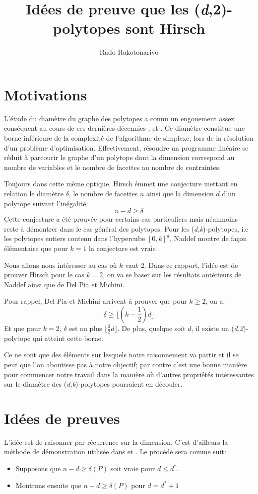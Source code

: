 \documentclass[11pt]{article}
\begin{document}
\title{Idées de preuve que les (\textit{d},2)-polytopes sont Hirsch}
\author{Rado Rakotonarivo}
\maketitle

\section{Motivations}
L'étude du diamètre du graphe des polytopes a connu un engouement assez conséquent au cours de ces dernières décennies \cite{deza2016improved}, \cite{naddef1989hirsch} et \cite{del2016diameter}. Ce diamètre constitue une borne inférieure de la complexité de l'algorithme de simplexe, lors de la résolution d'un problème d'optimisation. Effectivement, résoudre un programme linéaire se réduit à parcourir le graphe d'un polytope dont la dimension correspond au nombre de variables et le nombre de facettes au nombre de contraintes.

Toujours dans cette même optique, Hirsch émmet une conjecture  mettant en relation le diamètre $\delta$, le nombre de facettes $n$ ainsi que la dimension $d$ d'un polytope suivant l'inégalité: 
$$
	n-d\geq{\delta}
$$
Cette conjecture a été prouvée pour certains cas particuliers mais néanmoins reste à démontrer dans le cas général des polytopes. Pour les
(\textit{d,k})-polytopes, i.e les polytopes entiers contenu dans l'hypercube $[0,k]^d$, Naddef montre de façon élémentaire que pour $k=1$ la conjecture est vraie \cite{naddef1989hirsch}. 

Nous allons nous intéresser au cas où $k$ vaut 2. Dans ce rapport, l'idée est de prouver Hirsch pour le cas $k = 2$, on va se baser sur les résultats antérieurs de Naddef ainsi que de Del Pia et Michini. 

Pour rappel, Del Pia et Michini arrivent à prouver que pour $k\geq{2}$, on a:  
$$ 
	\delta\geq{\lfloor{(k-\frac{1}{2})}d\rfloor}
$$ 
Et que pour $k=2$, $\delta$ est au plus $\lfloor{\frac{3}{2}}d\rfloor$. De plus, quelque soit $d$, il existe un (\textit{d,2})-polytope qui atteint cette borne.

Ce ne sont que des éléments sur lesquels notre raisonnement va partir et il se peut que l'on aboutisse pas à notre objectif; par contre c'est une bonne manière pour commencer notre travail dans la manière où d'autres propriétés intéressantes sur le diamètre des (\textit{d,k})-polytopes pourraient en découler.

\section{Idées de preuves}
L'idée est de raisonner par récurrence sur la dimension. C'est d'ailleurs la méthode de démonstration utilisée dans\cite{naddef1989hirsch} et \cite{del2016diameter}. Le procédé sera comme suit:
\begin{itemize}
\item Supposons que $n-d\geq{\delta(P)}$ soit vraie pour  $d\leq{d^*}$.
\item Montrons ensuite que $n-d\geq{\delta(P)}$ pour $d = d^* + 1$
\end{itemize}
\end{document}
